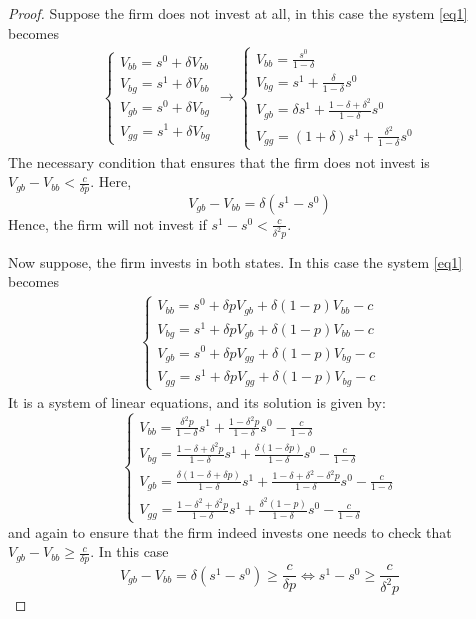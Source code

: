 \documentclass[a4paper]{article}
\begin{document}
\begin{proof}
	Suppose the firm does not invest at all, in this case the system \eqref{eq1} becomes
	\begin{align*}
	\begin{cases}
	V_{bb} = s^0 + \delta V_{bb}\\
	V_{bg} = s^1 + \delta V_{bb}\\
	V_{gb} = s^0 + \delta V_{bg}\\
	V_{gg} = s^1 + \delta V_{bg}
	\end{cases} \to \begin{cases}
	V_{bb} = \frac{s^0}{1-\delta}\\
	V_{bg} = s^1 +\frac{\delta}{1-\delta}s^0\\
	V_{gb} = \delta s^1 + \frac{1-\delta + \delta^2}{1-\delta}s^0\\
	V_{gg} = (1+\delta)s^1 + \frac{\delta^2}{1-\delta}s^0
	\end{cases}
	\end{align*}
	The necessary condition that ensures that the firm does not invest is $	V_{gb} - V_{bb} < \frac{c}{\delta p}$. Here, $$	V_{gb} - V_{bb} = \delta(s^1 - s^0)$$ Hence, the firm will not invest if $s^1 - s^0 < \frac{c}{\delta^2 p}$.
	
	
	
	Now suppose, the firm invests in both states. In this case the system \eqref{eq1} becomes
	\begin{align*}
	\begin{cases}
	V_{bb} = s^0 + \delta p V_{gb} + \delta(1-p)V_{bb} - c\\
	V_{bg} = s^1 + \delta p V_{gb} + \delta(1-p)V_{bb} - c\\
	V_{gb} = s^0 + \delta pV_{gg} + \delta(1-p)V_{bg} - c\\
	V_{gg} = s^1 + \delta p V_{gg} + \delta (1 - p)V_{bg} - c
	\end{cases}
	\end{align*}
	It is a system of linear equations, and its solution is given by:
	$$\begin{cases}
	V_{bb} = \frac{\delta^2p}{1-\delta}s^1 + \frac{1-\delta^2p}{1-\delta}s^0 - \frac{c}{1-\delta}\\
	V_{bg} = \frac{1-\delta + \delta^2p}{1-\delta}s^1 + \frac{\delta(1-\delta p)}{1-\delta}s^0 - \frac{c}{1-\delta}\\
	V_{gb} = \frac{\delta(1-\delta+\delta p)}{1-\delta}s^1 + \frac{1-\delta + \delta^2 - \delta^2 p}{1- \delta}s^0 - \frac{c}{1-\delta}\\
	V_{gg} = \frac{1 - \delta^2 + \delta^2 p}{1 - \delta}s^1 + \frac{\delta^2(1-p)}{1- \delta}s^0 - \frac{c}{1 - \delta}
	\end{cases}$$
	and again to ensure that the firm indeed invests one needs to check that $V_{gb} - V_{bb} \ge \frac{c}{\delta p}$. In this case $$V_{gb} - V_{bb} = \delta(s^1 - s^0) \ge \frac{c}{\delta p} \iff s^1 - s^0 \ge \frac{c}{\delta^2 p}$$
\end{proof}
\end{document}
